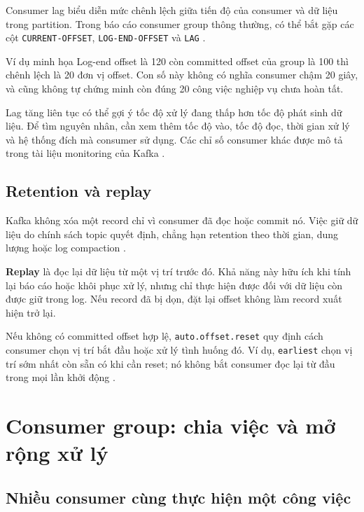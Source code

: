 Consumer lag biểu diễn mức chênh lệch giữa tiến độ của consumer và dữ liệu trong partition. Trong báo cáo consumer group thông thường, có thể bắt gặp các cột \texttt{CURRENT-\allowbreak{}OFFSET}, \texttt{LOG-\allowbreak{}END-\allowbreak{}OFFSET} và \texttt{LAG} \cite{kafka-basic-ops}.


\begin{examplebox}{Ví dụ minh họa}
Log-end offset là 120 còn committed offset của group là 100 thì chênh lệch là 20 đơn vị offset. Con số này không có nghĩa consumer chậm 20 giây, và cũng không tự chứng minh còn đúng 20 công việc nghiệp vụ chưa hoàn tất.
\end{examplebox}


Lag tăng liên tục có thể gợi ý tốc độ xử lý đang thấp hơn tốc độ phát sinh dữ liệu. Để tìm nguyên nhân, cần xem thêm tốc độ vào, tốc độ đọc, thời gian xử lý và hệ thống đích mà consumer sử dụng. Các chỉ số consumer khác được mô tả trong tài liệu monitoring của Kafka \cite{kafka-monitoring}.


\FloatBarrier
{}
\subsection{Retention và replay}

Kafka không xóa một record chỉ vì consumer đã đọc hoặc commit nó. Việc giữ dữ liệu do chính sách topic quyết định, chẳng hạn retention theo thời gian, dung lượng hoặc log compaction \cite{kafka-topic-configs}.


\textbf{Replay} là đọc lại dữ liệu từ một vị trí trước đó. Khả năng này hữu ích khi tính lại báo cáo hoặc khôi phục xử lý, nhưng chỉ thực hiện được đối với dữ liệu còn được giữ trong log. Nếu record đã bị dọn, đặt lại offset không làm record xuất hiện trở lại.


Nếu không có committed offset hợp lệ, \texttt{auto.\allowbreak{}offset.\allowbreak{}reset} quy định cách consumer chọn vị trí bắt đầu hoặc xử lý tình huống đó. Ví dụ, \texttt{earliest} chọn vị trí sớm nhất còn sẵn có khi cần reset; nó không bắt consumer đọc lại từ đầu trong mọi lần khởi động \cite{kafka-consumer-configs}.


\FloatBarrier
{}
\section{Consumer group: chia việc và mở rộng xử lý}

\FloatBarrier
{}
\subsection{Nhiều consumer cùng thực hiện một công việc}

